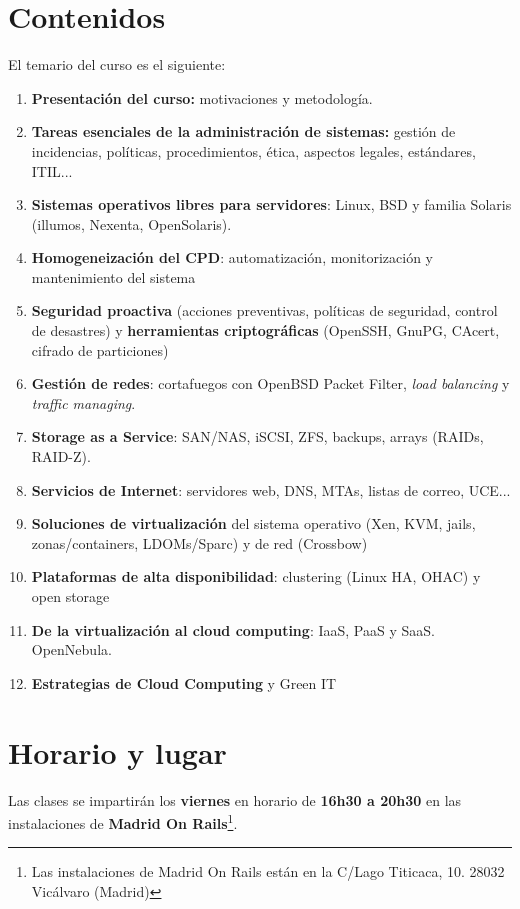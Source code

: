 \documentclass[a4paper]{article}
\begin{document}
  \section{Contenidos}
  El temario del curso es el siguiente:
  \begin{enumerate}
    \item \textbf{Presentación del curso:} motivaciones y metodología.
    \item \textbf{Tareas esenciales de la administración de sistemas:} gestión de incidencias, políticas, procedimientos, ética, aspectos legales, estándares, ITIL...
    \item \textbf{Sistemas operativos libres para servidores}: Linux, BSD y familia Solaris (illumos, Nexenta, OpenSolaris).
    \item \textbf{Homogeneización del CPD}: automatización, monitorización y mantenimiento del sistema
    \item \textbf{Seguridad proactiva} (acciones preventivas, políticas de seguridad, control de desastres) y \textbf{herramientas criptográficas} (OpenSSH, GnuPG, CAcert, cifrado de particiones)
    \item \textbf{Gestión de redes}: cortafuegos con OpenBSD Packet Filter, \textit{load balancing} y \textit{traffic managing}.
    \item \textbf{Storage as a Service}: SAN/NAS, iSCSI, ZFS, backups, arrays (RAIDs, RAID-Z).
    \item \textbf{Servicios de Internet}: servidores web, DNS, MTAs, listas de correo, UCE...
    \item \textbf{Soluciones de virtualización} del sistema operativo (Xen, KVM, jails, zonas/containers, LDOMs/Sparc) y de red (Crossbow)
    \item \textbf{Plataformas de alta disponibilidad}: clustering (Linux HA, OHAC) y open storage
    \item \textbf{De la virtualización al cloud computing}: IaaS, PaaS y SaaS. OpenNebula.
    \item \textbf{Estrategias de Cloud Computing} y Green IT
  \end{enumerate}

  \section{Horario y lugar}
  Las clases se impartirán los \textbf{viernes} en horario de \textbf{16h30 a 20h30} en las instalaciones de \textbf{Madrid On Rails}\footnote{Las instalaciones de Madrid On Rails están en la C/Lago Titicaca, 10. 28032 Vicálvaro (Madrid)}.
\end{document}

